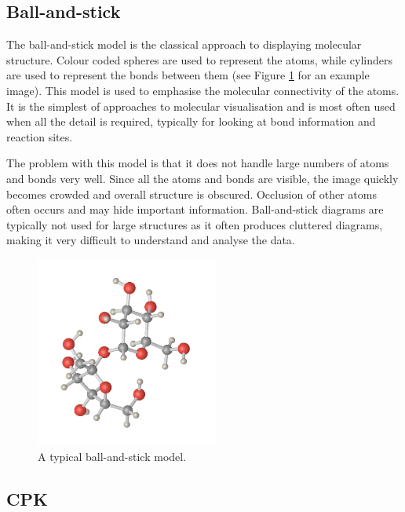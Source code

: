 
\subsection{Ball-and-stick}
\label{sub:background_ballstick}

The ball-and-stick model is the classical approach to displaying molecular
structure. Colour coded spheres are used to represent the atoms, while
cylinders are used to represent the bonds between them (see Figure
\ref{fig:background_ballstick} for an example image). This model is used to
emphasise the molecular connectivity of the atoms. It is the simplest of
approaches to molecular visualisation and is most often used when all the
detail is required, typically for looking at bond information and reaction
sites.

The problem with this model is that it does not handle large numbers of atoms
and bonds very well. Since all the atoms and bonds are visible, the image
quickly becomes crowded and overall structure is obscured. Occlusion of other
atoms often occurs and may hide important information. Ball-and-stick diagrams
are typically not used for large structures as it often produces cluttered
diagrams, making it very difficult to understand and analyse the data.

\begin{figure}[h!]
  \begin{center}
    \includegraphics[width=60mm]{ballstick}
  \end{center}
  \caption{A typical ball-and-stick model.}
  \label{fig:background_ballstick}
\end{figure}


\subsection{CPK}
\label{sub:background_cpk}

